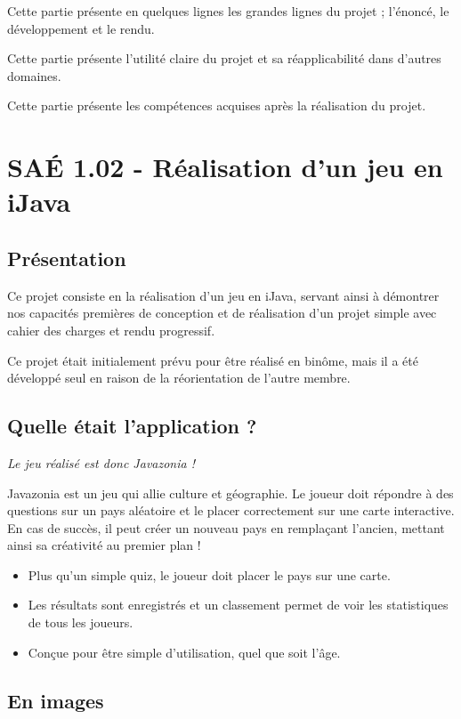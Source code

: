\documentclass{mytex}
\begin{document}
Cette partie présente en quelques lignes les grandes lignes du projet ; l'énoncé, le développement et le rendu.

Cette partie présente l'utilité claire du projet et sa réapplicabilité dans d'autres domaines.

Cette partie présente les compétences acquises après la réalisation du projet.

\section{SAÉ 1.02 - Réalisation d'un jeu en iJava}

\subsection{Présentation}

Ce projet consiste en la réalisation d'un jeu en iJava, servant ainsi à démontrer nos capacités premières de conception et de réalisation d'un projet simple avec cahier des charges et rendu progressif.

Ce projet était initialement prévu pour être réalisé en binôme, mais il a été développé seul en raison de la réorientation de l'autre membre.

\subsection{Quelle était l'application ?}

\textit{Le jeu réalisé est donc Javazonia !}

Javazonia est un jeu qui allie culture et géographie. Le joueur doit répondre à des questions sur un pays aléatoire et le placer correctement sur une carte interactive. En cas de succès, il peut créer un nouveau pays en remplaçant l'ancien, mettant ainsi sa créativité au premier plan !

\begin{itemize}
	\item Plus qu'un simple quiz, le joueur doit placer le pays sur une carte.
	\item Les résultats sont enregistrés et un classement permet de voir les statistiques de tous les joueurs.
	\item Conçue pour être simple d'utilisation, quel que soit l'âge.
\end{itemize}

\subsection{En images}
\end{document}
